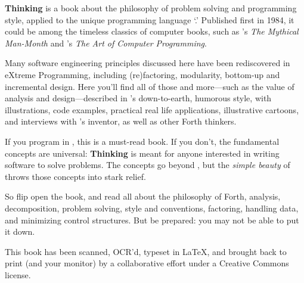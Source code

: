 
\noindent
\textbf{Thinking \Forth{}} is a book about the philosophy of problem
solving and programming style, applied to the unique programming
language `\Forth{}.' Published first in 1984, it could be among the
timeless classics of computer books, such as 's
\emph{The Mythical Man-Month} and 's \emph{The
Art of Computer Programming}.

Many software engineering principles discussed here have been
rediscovered in eXtreme Programming, including (re)factoring,
modularity, bottom-up and incremental design.  Here you'll find all of
those and more---such as the value of analysis and design---described
in 's down-to-earth, humorous style, with
illustrations, code examples, practical real life applications,
illustrative cartoons, and interviews with \Forth{}'s inventor,
 as well as other Forth thinkers.

If you program in \Forth{}, this is a must-read book.  If you don't,
the fundamental concepts are universal: \textbf{Thinking \Forth{}} is
meant for anyone interested in writing software to solve problems.
The concepts go beyond \Forth{}, but the \emph{simple beauty} of
\Forth{} throws those concepts into stark relief.

So flip open the book, and read all about the philosophy of Forth,
analysis, decomposition, problem solving, style and conventions,
factoring, handling data, and minimizing control structures.  But be
prepared: you may not be able to put it down.

\medskip
This book has been scanned, OCR'd, typeset in \LaTeX{}, and brought
back to print (and your monitor) by a collaborative effort under a Creative
Commons license.

